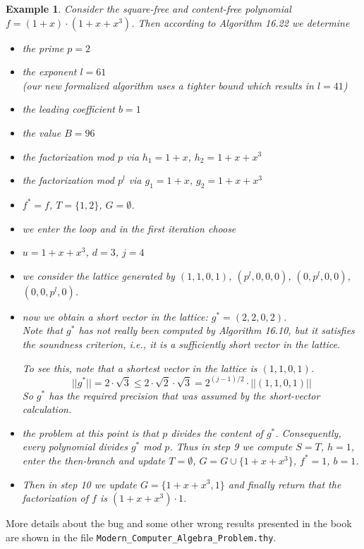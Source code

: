 \documentclass[11pt,a4paper]{article}
\newcommand\norm[1]{|\!|#1|\!|}
\newtheorem{example}{Example}
\begin{document}
\begin{example}
Consider the square-free and content-free polynomial 
$f = (1+x) \cdot (1 + x + x^3)$.
Then according to Algorithm 16.22 we determine 
\begin{itemize}
\item the prime $p = 2$
\item the exponent $l = 61$ \\
 (our new formalized algorithm uses a tighter bound which results in $l = 41$)
\item the leading coefficient $b = 1$
\item the value $B = 96$
\item the factorization mod $p$ via $h_1 = 1 + x$, $h_2 = 1 + x + x^3$
\item the factorization mod $p^l$ via $g_1 = 1 + x$, $g_2 = 1 + x + x^3$
\item $f^* = f$, $T = \{1,2\}$, $G = \emptyset$.
\item we enter the loop and in the first iteration choose 
\item $u = 1 + x + x^3$, $d = 3$, $j = 4$
\item we consider the lattice generated by $(1,1,0,1)$, 
  $(p^l,0,0,0)$, $(0,p^l,0,0)$, $(0,0,p^l,0)$.
\item now we obtain a short vector in the lattice:
  $g^* = (2,2,0,2)$. \\
  Note that $g^*$ has not really been computed by Algorithm 16.10, but
  it satisfies the soundness criterion, i.e., it is a sufficiently short vector
  in the lattice.
  
  To see this, note that a shortest vector in the lattice is $(1,1,0,1)$.
  \[
  \norm{g^*} = 2 \cdot \sqrt 3 
  \leq 2 \cdot \sqrt 2 \cdot \sqrt 3 
  = 2^{(j-1)/2} \cdot \norm{(1,1,0,1)}
  \]
  So $g^*$ has the required precision that was assumed by the
  short-vector calculation.
\item the problem at this point is that $p$ divides the content of $g^*$. 
  Consequently, every polynomial divides $g^*$ mod $p$.
  Thus in step 9 we compute $S = T$, $h = 1$, enter the then-branch and update
  $T = \emptyset$, $G = G \cup \{1 + x + x^3\}$, $f^* = 1$, $b = 1$.
\item Then in step 10 we update $G = \{1 + x + x^3, 1\}$ 
  and finally return that the factorization of $f$ is $(1 + x + x^3) \cdot 1$.
\end{itemize}
\end{example}

More details about the bug and some other wrong results presented in the book
are shown in the file \texttt{Modern\_Computer\_Algebra\_Problem.thy}.
\end{document}
